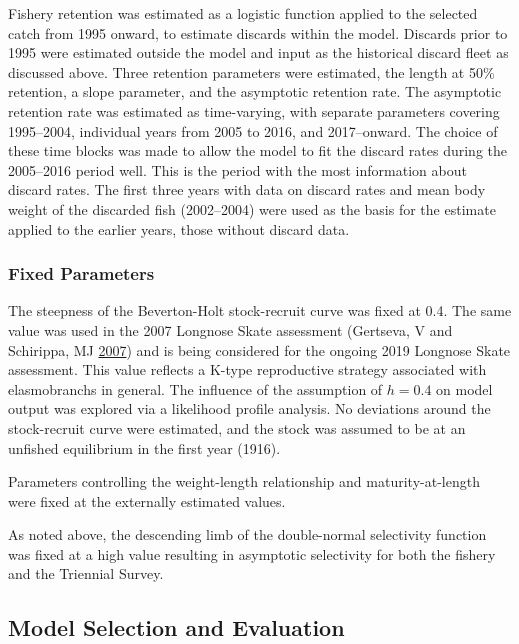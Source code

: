 \documentclass[12pt,]{article}
\begin{document}
Fishery retention was estimated as a logistic function applied to the
selected catch from 1995 onward, to estimate discards within the model.
Discards prior to 1995 were estimated outside the model and input as the
historical discard fleet as discussed above. Three retention parameters
were estimated, the length at 50\% retention, a slope parameter, and the
asymptotic retention rate. The asymptotic retention rate was estimated
as time-varying, with separate parameters covering 1995--2004,
individual years from 2005 to 2016, and 2017--onward. The choice of
these time blocks was made to allow the model to fit the discard rates
during the 2005--2016 period well. This is the period with the most
information about discard rates. The first three years with data on
discard rates and mean body weight of the discarded fish (2002--2004)
were used as the basis for the estimate applied to the earlier years,
those without discard data.

\hypertarget{fixed-parameters}{%
\subsubsection{Fixed Parameters}\label{fixed-parameters}}

The steepness of the Beverton-Holt stock-recruit curve was fixed at 0.4.
The same value was used in the 2007 Longnose Skate assessment (Gertseva,
V and Schirippa, MJ \protect\hyperlink{ref-Gertseva2007}{2007}) and is
being considered for the ongoing 2019 Longnose Skate assessment. This
value reflects a K-type reproductive strategy associated with
elasmobranchs in general. The influence of the assumption of \(h=0.4\)
on model output was explored via a likelihood profile analysis. No
deviations around the stock-recruit curve were estimated, and the stock
was assumed to be at an unfished equilibrium in the first year (1916).

Parameters controlling the weight-length relationship and
maturity-at-length were fixed at the externally estimated values.

As noted above, the descending limb of the double-normal selectivity
function was fixed at a high value resulting in asymptotic selectivity
for both the fishery and the Triennial Survey.

\hypertarget{model-selection-and-evaluation}{%
\subsection{Model Selection and
Evaluation}\label{model-selection-and-evaluation}}
\end{document}
